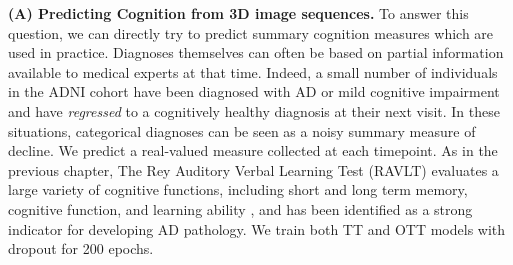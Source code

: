 \textbf{(A) Predicting Cognition from 3D image sequences.}
To answer this question, we can directly try to predict summary cognition measures which are used in practice.
Diagnoses themselves can often be based on partial information available
to medical experts at that time. Indeed, a small number of individuals in the ADNI cohort have been diagnosed
with AD or mild cognitive impairment and have \textit{regressed} to a cognitively healthy diagnosis at their next visit. In these situations,
categorical diagnoses can be seen as a noisy summary measure of decline.
We predict a real-valued measure collected at each timepoint.
As in the previous chapter, The Rey Auditory Verbal Learning Test (RAVLT) evaluates a large variety of cognitive
functions, including short and long term memory, cognitive function, and learning ability \citep{schmidt1996rey}, and
has been identified as a strong indicator for developing AD pathology. We train both TT and OTT models with dropout for 200 epochs.

